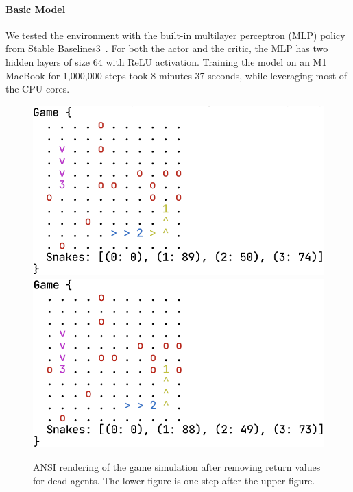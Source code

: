 \documentclass[conference]{IEEEtran}
\begin{document}
\paragraph{Basic Model}

We tested the environment with the built-in multilayer perceptron (MLP)
policy from Stable Baselines3~\cite{raffin2024stable}.
For both the actor and the critic,
the MLP has two hidden layers of size 64 with ReLU activation.
Training the model on an M1 MacBook for 1,000,000 steps took 8 minutes 37
seconds, while leveraging most of the CPU cores.

\begin{figure}
    \centering
    \includegraphics[width=\linewidth]{game_render_eg2.png}\\[12pt]
    \includegraphics[width=\linewidth]{game_render_eg3.png}
    \caption{ANSI rendering of the game simulation after removing return values
        for dead agents. The lower figure is one step after the upper figure.
    }
    \label{fig:render2}
\end{figure}
\end{document}
